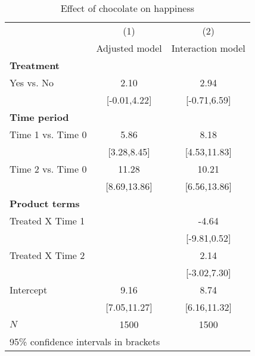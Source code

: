 \begin{table}[htbp]\centering
\caption{Effect of chocolate on happiness}
\begin{tabular}{l*{2}{c}}
\hline\hline
            &\multicolumn{1}{c}{(1)}&\multicolumn{1}{c}{(2)}\\
            &\multicolumn{1}{c}{Adjusted model}&\multicolumn{1}{c}{Interaction model}\\
\hline
\textbf{Treatment}&                      &                      \\
[1em]
Yes vs. No  &                  2.10&                  2.94\\
            &          [-0.01,4.22]&          [-0.71,6.59]\\
[1em]
\textbf{Time period}&                      &                      \\
[1em]
Time 1 vs. Time 0&                  5.86&                  8.18\\
            &           [3.28,8.45]&          [4.53,11.83]\\
[1em]
Time 2 vs. Time 0&                 11.28&                 10.21\\
            &          [8.69,13.86]&          [6.56,13.86]\\
[1em]
\textbf{Product terms}&                      &                      \\
[1em]
Treated X Time 1&                      &                 -4.64\\
            &                      &          [-9.81,0.52]\\
[1em]
Treated X Time 2&                      &                  2.14\\
            &                      &          [-3.02,7.30]\\
[1em]
Intercept   &                  9.16&                  8.74\\
            &          [7.05,11.27]&          [6.16,11.32]\\
\hline
\(N\)       &                  1500&                  1500\\
\hline\hline
\multicolumn{3}{l}{\footnotesize 95\% confidence intervals in brackets}\\
\end{tabular}
\end{table}
